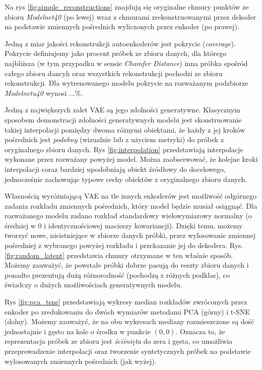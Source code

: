 \documentclass[12pt]{extarticle}
\begin{document}
Na rys \ref{fig:simple_reconstructions} znajdują się oryginalne chmury punktów ze zbioru \textit{Modelnet40} (po lewej)
wraz z chmurami zrekonstruowanymi przez dekoder na podstawie zmiennych pośrednich wyliczonych przez enkoder (po prawej).

Jedną z miar jakości rekonstrukcji autoenkoderów jest pokrycie (\textit{coverage}). Pokrycie definiujemy jako procent
próbek ze zbioru danych, dla którego najbliższa (w tym przypadku w sensie \textit{Chamfer Distance}) inna próbka
spośród całego zbioru dancyh oraz wszystkich rekonstrukcji pochodzi ze zbioru rekonstrukcji.
Dla wytrenowanego modelu pokrycie na rozważanym podzbiorze \textit{Modelnetu40} wynosi $...\%$.

Jedną z największych zalet VAE są jego zdolności generatywne. Klasycznym sposobem demonstracji zdolności generatywnych
modelu jest skonstruowanie takiej interpolacji pomiędzy dwoma różnymi obiektami, że każdy z jej kroków pośrednich
jest \textit{podobny} (wizualnie lub z użyciem metryki) do próbek z oryginalnego zbioru danych. Rys \ref{fig:interpolation}
przedstawiają interpolacje wykonane przez rozważany powyżej model. Można zaobserwować, że kolejne kroki interpolacji
coraz bardziej upodobniają obiekt źródłowy do docelowego, jednocześnie zachowując typowe cechy obiektów z oryginalnego
zbioru danych.

Własnością wyróżniającą VAE na tle innych enkoderów jest możliwość odgórnego zadania rozkładu zmiennych pośrednich,
który model będzie musiał osiągnąć. Dla rozważanego modelu zadano rozkład standardowy wielowymiarowy normalny
(o średniej w 0 i identycznościowej macierzy kowariancji). Dzięki temu, możemy tworzyć nowe, nieistniejące w zbiorze
danych próbki, przez wylosowanie zmiennej pośredniej z wybranego powyżej rozkładu i przekazanie jej do dekodera.
Rys. \ref{fig:random_latent} przedstawia chmury otrzymane w ten właśnie sposób. Możemy zauważyć, że powstałe
próbki dobrze pasują do reszty zbioru danych i ponadto prezentują dużą różnorodność (pochodzą z różnych podklas),
co świadczy o dużych możliwościach generatywnych modelu.

Rys \ref{fig:pca_tsne} przedstawiają wykresy median rozkładów zwróconych przez enkoder po zredukowaniu
do dwóch wymiarów metodami PCA (górny) i t-SNE (dolny). Możemy zauważyć, że na obu wykresach mediany rozmieszczone
są dość jednostajnie i gęsto na kole o środku w punkcie $(0, 0)$. Oznacza to, że reprezentacja próbek ze zbioru jest
\textit{ściśnięta} do zera i gęsta, co umożliwia przeprowadzenie interpolacji oraz tworzenie syntetycznych próbek
na podstawie wylosowanych zmiennych pośrednich (jak wyżej).




\end{document}
